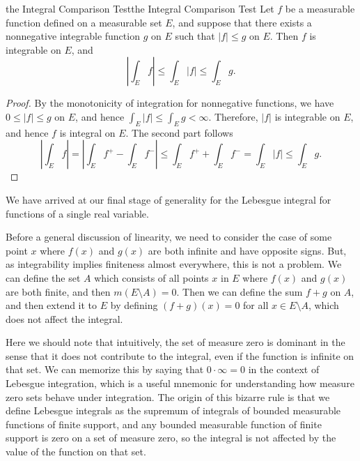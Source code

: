 \documentclass[../main.tex]{subfiles}
\begin{document}
\begin{proposition}{the Integral Comparison Test}{the Integral Comparison Test}
	Let $f$ be a measurable function defined on a measurable set $E$, and suppose that there exists a nonnegative integrable function $g$ on $E$ such that $|f| \leq g$ on $E$. Then $f$ is integrable on $E$, and
	\begin{equation}
		\left| \int_E f \right| \leq \int_E |f| \leq \int_E g.
	\end{equation}
\end{proposition}
\begin{proof}
	By the monotonicity of integration for nonnegative functions, we have $0 \leq |f| \leq g$ on $E$, and hence $\int_E |f| \leq \int_E g < \infty$. Therefore, $|f|$ is integrable on $E$, and hence $f$ is integral on $E$. The second part follows
	\begin{equation*}
		\left| \int_E f \right| = \left| \int_E f^+ - \int_E f^- \right| \leq \int_E f^+ + \int_E f^- = \int_E |f| \leq \int_E g.
	\end{equation*}
\end{proof}

We have arrived at our final stage of generality for the Lebesgue integral for functions of a single real variable.

Before a general discussion of linearity, we need to consider the case of some point $x$ where $f(x)$ and $g(x)$ are both infinite and have opposite signs. But, as integrability implies finiteness almost everywhere, this is not a problem. We can define the set $A$ which consists of all points $x$ in $E$ where $f(x)$ and $g(x)$ are both finite, and then $m(E \setminus A) = 0$. Then we can define the sum $f + g$ on $A$, and then extend it to $E$ by defining $(f + g)(x) = 0$ for all $x \in E \setminus A$, which does not affect the integral.

\begin{remark}
	Here we should note that intuitively, the set of measure zero is dominant in the sense that it does not contribute to the integral, even if the function is infinite on that set. We can memorize this by saying that $0 \cdot \infty = 0$ in the context of Lebesgue integration, which is a useful mnemonic for understanding how measure zero sets behave under integration. The origin of this bizarre rule is that we define Lebesgue integrals as the supremum of integrals of bounded measurable functions of finite support, and any bounded measurable function of finite support is zero on a set of measure zero, so the integral is not affected by the value of the function on that set.
\end{remark}
\end{document}
